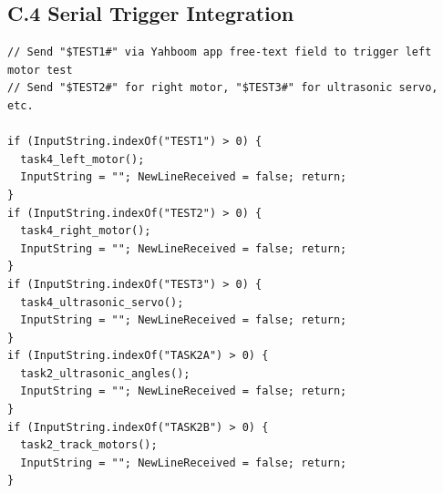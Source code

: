 \documentclass[12pt,a4paper]{article}
\begin{document}
\subsection*{C.4 \quad Serial Trigger Integration}

\begin{lstlisting}[style=arduino,caption={Serial trigger block --- add inside serial\_data\_parse()}]
// Send "$TEST1#" via Yahboom app free-text field to trigger left motor test
// Send "$TEST2#" for right motor, "$TEST3#" for ultrasonic servo, etc.

if (InputString.indexOf("TEST1") > 0) {
  task4_left_motor();
  InputString = ""; NewLineReceived = false; return;
}
if (InputString.indexOf("TEST2") > 0) {
  task4_right_motor();
  InputString = ""; NewLineReceived = false; return;
}
if (InputString.indexOf("TEST3") > 0) {
  task4_ultrasonic_servo();
  InputString = ""; NewLineReceived = false; return;
}
if (InputString.indexOf("TASK2A") > 0) {
  task2_ultrasonic_angles();
  InputString = ""; NewLineReceived = false; return;
}
if (InputString.indexOf("TASK2B") > 0) {
  task2_track_motors();
  InputString = ""; NewLineReceived = false; return;
}
\end{lstlisting}

\newpage



\end{document}
